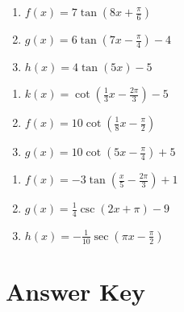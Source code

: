 \smallskip
\begin{multicols}{3}
\begin{enumerate}	\setcounter{enumi}{\value{Review}}
	\item $f(x) = 7\tan\left(8x+\frac{\pi}{6}\right)$
	\item $g(x) = 6\tan\left(7x-\frac{\pi}{4}\right)-4$
	\item $h(x) = 4\tan(5x)-5$
\end{enumerate}	\setcounter{Review}{\value{enumi}}
\end{multicols}
\smallskip
\begin{multicols}{3}
\begin{enumerate}	\setcounter{enumi}{\value{Review}}
	\item $k(x) = \cot\left(\frac{1}{3}x-\frac{2\pi}{3}\right)-5$
	\item $f(x) = 10\cot\left(\frac{1}{8}x-\frac{\pi}{2}\right)$
	\item $g(x) = 10\cot\left(5x-\frac{\pi}{4}\right)+5$
\end{enumerate}
\end{multicols}
\smallskip
\begin{multicols}{3}
\begin{enumerate}	\setcounter{enumi}{\value{Review}}
\item $f(x) = -3\tan\left(\frac{x}{5}-\frac{2\pi}{3}\right) + 1$
\item $g(x) = \frac{1}{4}\csc\left(2x+\pi\right) - 9$
\item $h(x) = -\frac{1}{10}\sec\left(\pi x - \frac{\pi}{2}\right)$
\end{enumerate}
\end{multicols}
\smallskip

\newpage

\section{Answer Key}

